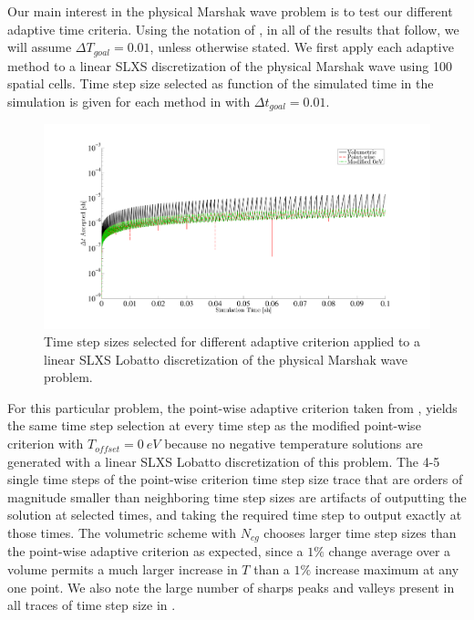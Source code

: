Our main interest in the physical Marshak wave problem is to test our different adaptive time criteria.  
Using the notation of , in all of the results that follow, we will assume $\Delta T_{goal} = 0.01$, unless otherwise stated.
We first apply  each adaptive method to a linear SLXS discretization of the physical Marshak wave using 100 spatial cells.
Time step size selected as function of the simulated time in the simulation is given for each method in  with $\Delta t_{goal} =0.01$.
\begin{figure}[!htp]
\centering
\includegraphics[width=17cm,trim=2in  0.4in 0.5in 0.75in,clip=true]{chapter6_grey_radtran/Dissertation_Data/P1_vs_time.pdf}
\caption{Time step sizes selected for different adaptive criterion applied to a linear SLXS Lobatto discretization of the physical Marshak wave problem.}
\label{fig:linear_time_steps}
\end{figure}
For this particular problem, the point-wise adaptive criterion taken from \cite{time_adaptive_diffusion}, yields the same time step selection at every time step as the modified point-wise criterion with $T_{offset}=0~eV$ because no negative temperature solutions are generated with a linear SLXS Lobatto discretization of this problem.
The 4-5 single time steps of the point-wise criterion time step size trace that are orders of magnitude smaller than neighboring time step sizes are artifacts of outputting the solution at selected times, and taking the required time step to output exactly at those times.
The volumetric scheme with $N_{cg}$ chooses larger time step sizes than the point-wise adaptive criterion as expected, since a $1\%$ change average over a volume permits a much larger increase in $T$ than a $1\%$ increase maximum at any one point.
We also note the large number of sharps peaks and valleys present in all traces of time step size in .  
